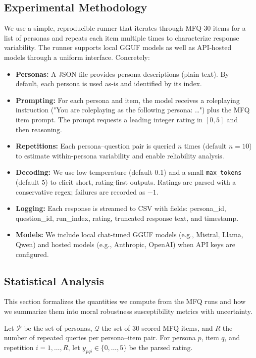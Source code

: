 \documentclass{article}
\begin{document}
\subsection{Experimental Methodology}
We use a simple, reproducible runner that iterates through MFQ-30 items for a list of personas and repeats each item multiple times to characterize response variability. The runner supports local GGUF models as well as API-hosted models through a uniform interface. Concretely:
\begin{itemize}
  \item \textbf{Personas:} A JSON file provides persona descriptions (plain text). By default, each persona is used as-is and identified by its index.
  \item \textbf{Prompting:} For each persona and item, the model receives a roleplaying instruction ("You are roleplaying as the following persona: \ldots") plus the MFQ item prompt. The prompt requests a leading integer rating in \([0,5]\) and then reasoning.
  \item \textbf{Repetitions:} Each persona--question pair is queried \(n\) times (default \(n=10\)) to estimate within-persona variability and enable reliability analysis.
  \item \textbf{Decoding:} We use low temperature (default 0.1) and a small \texttt{max\_tokens} (default 5) to elicit short, rating-first outputs. Ratings are parsed with a conservative regex; failures are recorded as \(-1\).
  \item \textbf{Logging:} Each response is streamed to CSV with fields: persona\_id, question\_id, run\_index, rating, truncated response text, and timestamp.
  \item \textbf{Models:} We include local chat-tuned GGUF models (e.g., Mistral, Llama, Qwen) and hosted models (e.g., Anthropic, OpenAI) when API keys are configured.
\end{itemize}


\subsection{Statistical Analysis}



This section formalizes the quantities we compute from the MFQ runs and how we summarize them into moral robustness susceptibility metrics with uncertainty.

Let \(\mathcal{P}\) be the set of personas, \(\mathcal{Q}\) the set of 30 scored MFQ items, and \(R\) the number of repeated queries per persona--item pair. For persona \(p\), item \(q\), and repetition \(i=1,\ldots,R\), let \(y_{pqi}\in\{0,\ldots,5\}\) be the parsed rating.
\end{document}

